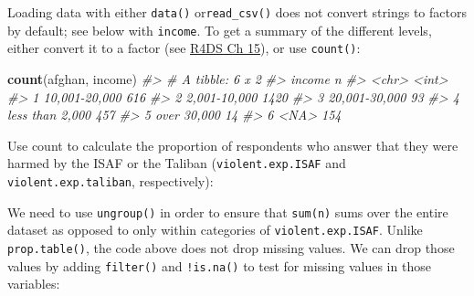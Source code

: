 \documentclass[]{book}
\newenvironment{Shaded}{\begin{snugshade}}{\end{snugshade}}
\newcommand{\KeywordTok}[1]{\textcolor[rgb]{0.13,0.29,0.53}{\textbf{#1}}}
\newcommand{\DataTypeTok}[1]{\textcolor[rgb]{0.13,0.29,0.53}{#1}}
\newcommand{\StringTok}[1]{\textcolor[rgb]{0.31,0.60,0.02}{#1}}
\newcommand{\CommentTok}[1]{\textcolor[rgb]{0.56,0.35,0.01}{\textit{#1}}}
\newcommand{\OperatorTok}[1]{\textcolor[rgb]{0.81,0.36,0.00}{\textbf{#1}}}
\newcommand{\NormalTok}[1]{#1}
\theoremstyle{definition}
\theoremstyle{definition}
\theoremstyle{definition}
\theoremstyle{remark}
\begin{document}
Loading data with either \texttt{data()} or\texttt{read\_csv()} does not
convert strings to factors by default; see below with \texttt{income}.
To get a summary of the different levels, either convert it to a factor
(see \href{http://r4ds.had.co.nz/factors.html}{R4DS Ch 15}), or use
\texttt{count()}:

\begin{Shaded}
\begin{Highlighting}[]
\KeywordTok{count}\NormalTok{(afghan, income)}
\CommentTok{#> # A tibble: 6 x 2}
\CommentTok{#>   income              n}
\CommentTok{#>   <chr>           <int>}
\CommentTok{#> 1 10,001-20,000     616}
\CommentTok{#> 2 2,001-10,000     1420}
\CommentTok{#> 3 20,001-30,000      93}
\CommentTok{#> 4 less than 2,000   457}
\CommentTok{#> 5 over 30,000        14}
\CommentTok{#> 6 <NA>              154}
\end{Highlighting}
\end{Shaded}

Use count to calculate the proportion of respondents who answer that
they were harmed by the ISAF or the Taliban (\texttt{violent.exp.ISAF}
and \texttt{violent.exp.taliban}, respectively):

\begin{Shaded}
\end{Shaded}

We need to use \texttt{ungroup()} in order to ensure that
\texttt{sum(n)} sums over the entire dataset as opposed to only within
categories of \texttt{violent.exp.ISAF}. Unlike \texttt{prop.table()},
the code above does not drop missing values. We can drop those values by
adding \texttt{filter()} and \texttt{!is.na()} to test for missing
values in those variables:
\end{document}
